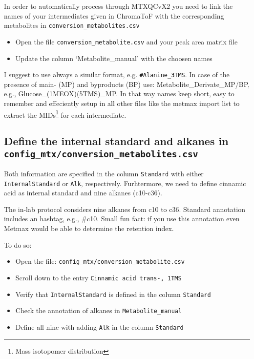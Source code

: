 \documentclass[]{book}
\providecommand{\tightlist}{%
  \setlength{\itemsep}{0pt}\setlength{\parskip}{0pt}}
\let\rmarkdownfootnote\footnote%
\def\footnote{\protect\rmarkdownfootnote}
\begin{document}
In order to automatically process through MTXQCvX2 you need to link the names of your intermediates given in ChromaToF with the corresponding metabolites in \texttt{conversion\_metabolites.csv}

\begin{itemize}
\tightlist
\item
  Open the file \texttt{conversion\_metabolite.csv} and your peak area matrix file
\item
  Update the column `Metabolite\_manual' with the choosen names
\end{itemize}

I suggest to use always a similar format, e.g. \texttt{\#Alanine\_3TMS}. In case of the presence of main- (MP) and byproducts (BP) use: Metabolite\_Derivate\_MP/BP, e.g., Glucose\_(1MEOX)(5TMS)\_MP.
In that way names keep short, easy to remember and effeciently setup in all other files like the metmax import list to extract the MIDs\footnote{Mass isotopomer distribution} for each intermediate.

\hypertarget{define-the-internal-standard-and-alkanes-in-config_mtxconversion_metabolites.csv}{%
\subsection{\texorpdfstring{Define the internal standard and alkanes in \texttt{config\_mtx/conversion\_metabolites.csv}}{Define the internal standard and alkanes in config\_mtx/conversion\_metabolites.csv}}\label{define-the-internal-standard-and-alkanes-in-config_mtxconversion_metabolites.csv}}

Both information are specified in the column \texttt{Standard} with either \texttt{InternalStandard} or \texttt{Alk}, respectively. Furhtermore, we need to define cinnamic acid as internal standard and nine alkanes (c10-c36).

The in-lab protocol considers nine alkanes from c10 to c36. Standard annotation includes an hashtag, e.g., \#c10. Small fun fact: if you use this annotation even Metmax would be able to determine the retention index.

To do so:

\begin{itemize}
\tightlist
\item
  Open the file: \texttt{config\_mtx/conversion\_metabolite.csv}
\item
  Scroll down to the entry \texttt{Cinnamic\ acid\ trans-,\ 1TMS}
\item
  Verify that \texttt{InternalStandard} is defined in the column \texttt{Standard}
\item
  Check the annotation of alkanes in \texttt{Metabolite\_manual}
\item
  Define all nine with adding \texttt{Alk} in the column \texttt{Standard}
\end{itemize}
\end{document}
